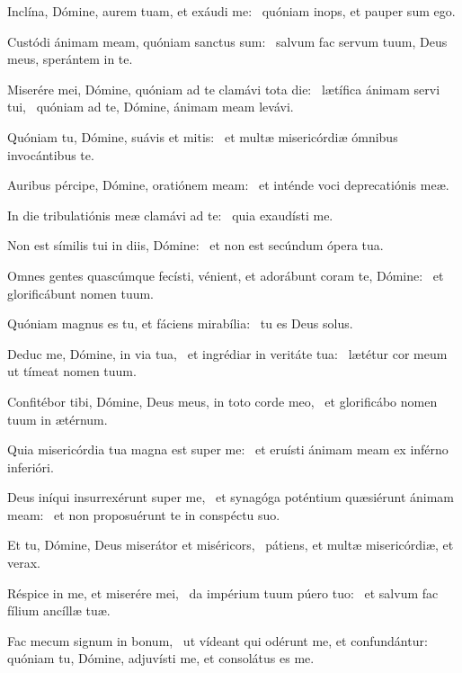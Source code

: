 \item Inclína, Dómine, aurem tuam, et exáudi me:~\psstar{} quóniam inops, et pauper sum ego.

\item Custódi ánimam meam, quóniam sanctus sum:~\psstar{} salvum fac servum tuum, Deus meus, sperántem in te.

\item Miserére mei, Dómine, quóniam ad te clamávi tota die:~\pscross{} lætífica ánimam servi tui,~\psstar{} quóniam ad te, Dómine, ánimam meam levávi.

\item Quóniam tu, Dómine, suávis et mitis:~\psstar{} et multæ misericórdiæ ómnibus invocántibus te.

\item Auribus pércipe, Dómine, oratiónem meam:~\psstar{} et inténde voci deprecatiónis meæ.

\item In die tribulatiónis meæ clamávi ad te:~\psstar{} quia exaudísti me.

\item Non est símilis tui in diis, Dómine:~\psstar{} et non est secúndum ópera tua.

\item Omnes gentes quascúmque fecísti, vénient, et adorábunt coram te, Dómine:~\psstar{} et glorificábunt nomen tuum.

\item Quóniam magnus es tu, et fáciens mirabília:~\psstar{} tu es Deus solus.

\item Deduc me, Dómine, in via tua,~\pscross{} et ingrédiar in veritáte tua:~\psstar{} lætétur cor meum ut tímeat nomen tuum.

\item Confitébor tibi, Dómine, Deus meus, in toto corde meo,~\psstar{} et glorificábo nomen tuum in ætérnum.

\item Quia misericórdia tua magna est super me:~\psstar{} et eruísti ánimam meam ex inférno inferióri.

\item Deus iníqui insurrexérunt super me,~\pscross{} et synagóga poténtium quæsiérunt ánimam meam:~\psstar{} et non proposuérunt te in conspéctu suo.

\item Et tu, Dómine, Deus miserátor et miséricors,~\psstar{} pátiens, et multæ misericórdiæ, et verax.

\item Réspice in me, et miserére mei,~\pscross{} da impérium tuum púero tuo:~\psstar{} et salvum fac fílium ancíllæ tuæ.

\item Fac mecum signum in bonum,~\pscross{} ut vídeant qui odérunt me, et confundántur:~\psstar{} quóniam tu, Dómine, adjuvísti me, et consolátus es me.
